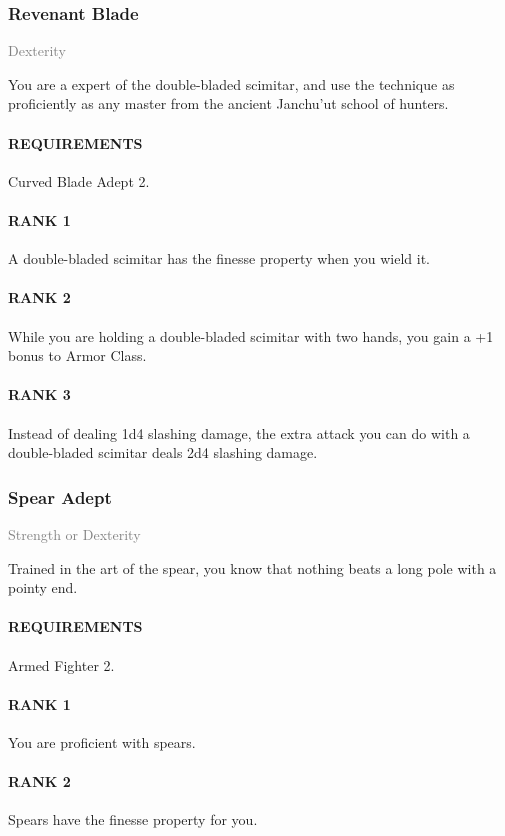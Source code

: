\subsubsection{Revenant Blade} \label{feat::revenantblade}
\small{\textcolor{gray}{Dexterity}}

\normalsize
You are a expert of the double-bladed scimitar, and use the technique as proficiently as any master from the ancient Janchu'ut school of hunters.
\paragraph{REQUIREMENTS} Curved Blade Adept 2.
\paragraph{RANK 1} A double-bladed scimitar has the finesse property when you wield it.
\paragraph{RANK 2} While you are holding a double-bladed scimitar with two hands, you gain a +1 bonus to Armor Class.
\paragraph{RANK 3} Instead of dealing 1d4 slashing damage, the extra attack you can do with a double-bladed scimitar deals 2d4 slashing damage.

\subsubsection{Spear Adept} \label{feat::spearadept}
\small{\textcolor{gray}{Strength or Dexterity}}

\normalsize
Trained in the art of the spear, you know that nothing beats a long pole with a pointy end.
\paragraph{REQUIREMENTS} Armed Fighter 2.
\paragraph{RANK 1} You are proficient with spears.
\paragraph{RANK 2} Spears have the finesse property for you.
